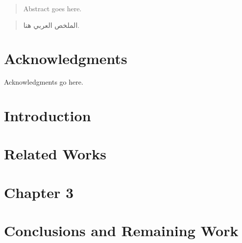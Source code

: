 \documentclass[a4paper]{report}
\begin{document}
\tableofcontents
\thispagestyle{empty}
\newpage

{}


\begin{abstract}
	Abstract goes here.
\end{abstract}

\begin{otherlanguage}{arabic}
	\begin{abstract}
		الملخص العربي هنا.
	\end{abstract}
\end{otherlanguage}

\chapter*{Acknowledgments}
Acknowledgments go here.


\listoftables
{} %
\newpage

\listoffigures
{} %
\newpage

\clearpage
{}

\chapter{Introduction}


\chapter{Related Works}


\chapter{Chapter 3}


\chapter{Conclusions and Remaining Work}

\end{document}
